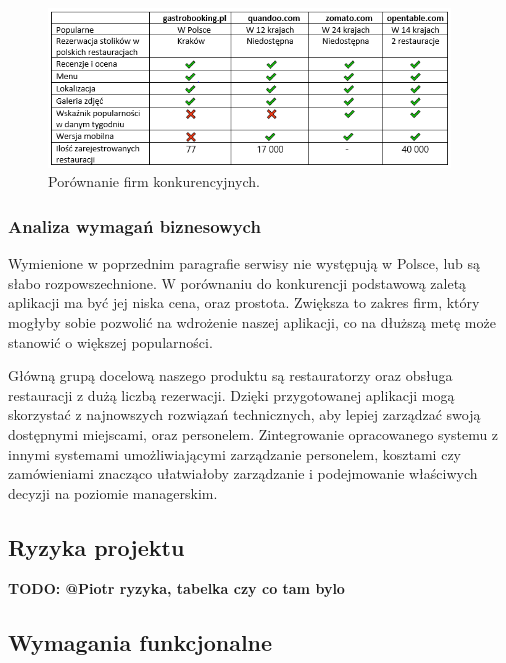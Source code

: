 \documentclass{article}
\begin{document}
\begin{figure}[h]
\centering
	\includegraphics[width=0.95\textwidth]{konkurencjaTabela}
	\caption{Porównanie firm konkurencyjnych.}
\end{figure}

\subsubsection{Analiza wymagań biznesowych}

Wymienione w poprzednim paragrafie serwisy nie występują w Polsce, lub są słabo rozpowszechnione. W porównaniu do konkurencji podstawową zaletą aplikacji ma być jej niska cena, oraz prostota. Zwiększa to zakres firm, który mogłyby sobie pozwolić na wdrożenie naszej aplikacji, co na dłuższą metę może stanowić o większej popularności.

Główną grupą docelową naszego produktu są restauratorzy oraz obsługa restauracji z dużą liczbą rezerwacji. Dzięki przygotowanej aplikacji mogą skorzystać z najnowszych rozwiązań technicznych, aby lepiej zarządzać swoją dostępnymi miejscami, oraz personelem. Zintegrowanie opracowanego systemu z innymi systemami umożliwiającymi zarządzanie personelem, kosztami czy zamówieniami znacząco ułatwiałoby zarządzanie i podejmowanie właściwych decyzji na poziomie managerskim. 
\subsection*{Ryzyka projektu}
{\color{red}\textbf{TODO: @Piotr ryzyka, tabelka czy co tam bylo}}

\subsection{Wymagania funkcjonalne}
\end{document}
